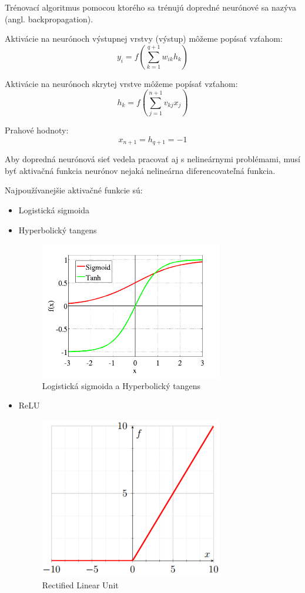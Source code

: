 Trénovací algoritmus pomocou ktorého sa trénujú dopredné neurónové sa nazýva  (angl. backpropagation).

Aktivácie na neurónoch výstupnej vrstvy (výstup) môžeme popísať vzťahom:
\begin{equation}
y_i = f(\sum_{k=1}^{q+1}w_{ik}h_{k})
\end{equation}

Aktivácie na neurónoch skrytej vrstve môžeme popísať vzťahom:
\begin{equation}
	h_{k} = f(\sum_{j=1}^{n+1}v_{kj}x_{j})
\end{equation}

Prahové hodnoty:
\begin{equation}
	x_{n+1} = h_{q+1} = -1
\end{equation}

Aby dopredná neurónová sieť vedela pracovať aj s nelineárnymi problémami, musí byť aktivačná funkcia neurónov
nejaká nelineárna diferencovateľná funkcia. 

Najpoužívanejšie aktivačné funkcie sú:

\begin{itemize}
	\item Logistická sigmoida
	\item Hyperbolický tangens
	
	\begin{figure}[H]
		\centering
		\includegraphics[width=8cm]{assets/activation_functions}
		\caption{Logistická sigmoida a Hyperbolický tangens}
	\end{figure}
	\item ReLU
	\begin{figure}[H]
		\centering
		\includegraphics[width=8cm]{assets/relu}
		\caption{Rectified Linear Unit}
	\end{figure}
\end{itemize}

